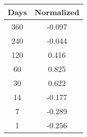 \begin{tabular}{||c c||} 
 \hline
 Days & Normalized \\ [0.5ex] 
 \hline\hline
 360 & -0.097 \\
 \hline
 240 & -0.044 \\
 \hline
 120 &  0.416 \\
 \hline
  60 &  0.825 \\
 \hline
  30 &  0.622 \\
 \hline
  14 & -0.177 \\
 \hline
   7 & -0.289 \\
 \hline
   1 & -0.256 \\ [1ex] 
 \hline
\end{tabular}